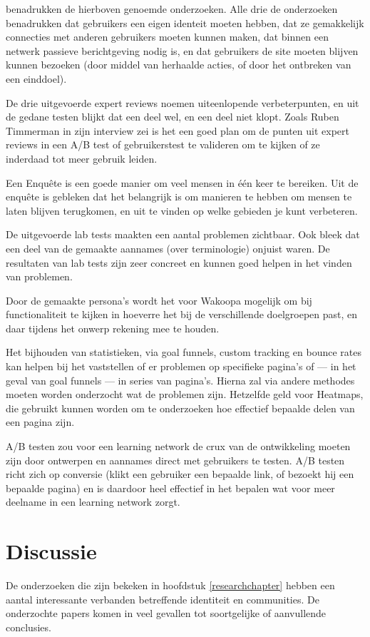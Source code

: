 \documentclass[a4paper, 10pt, pdftex]{report}
\begin{document}
    \citeauthor{Sloep2009} benadrukken de hierboven genoemde onderzoeken. Alle drie de onderzoeken benadrukken dat gebruikers een eigen identeit moeten hebben, dat ze gemakkelijk connecties met anderen gebruikers moeten kunnen maken, dat binnen een netwerk passieve berichtgeving nodig is, en dat gebruikers de site moeten blijven kunnen bezoeken (door middel van herhaalde acties, of door het ontbreken van een einddoel).

    De drie uitgevoerde expert reviews noemen uiteenlopende verbeterpunten, en uit de gedane testen blijkt dat een deel wel, en een deel niet klopt. Zoals Ruben Timmerman in zijn interview zei is het een goed plan om de punten uit expert reviews in een A/B test of gebruikerstest te valideren om te kijken of ze inderdaad tot meer gebruik leiden.

    Een Enqu\^ete is een goede manier om veel mensen in \'e\'en keer te bereiken. Uit de enqu\^ete is gebleken dat het belangrijk is om manieren te hebben om mensen te laten blijven terugkomen, en uit te vinden op welke gebieden je kunt verbeteren.

    De uitgevoerde lab tests maakten een aantal problemen zichtbaar. Ook bleek dat een deel van de gemaakte aannames (over terminologie) onjuist waren. De resultaten van lab tests zijn zeer concreet en kunnen goed helpen in het vinden van problemen.

    Door de gemaakte persona's wordt het voor Wakoopa mogelijk om bij functionaliteit te kijken in hoeverre het bij de verschillende doelgroepen past, en daar tijdens het onwerp rekening mee te houden.

    Het bijhouden van statistieken, via goal funnels, custom tracking en bounce rates kan helpen bij het vaststellen of er problemen op specifieke pagina's of --- in het geval van goal funnels --- in series van pagina's. Hierna zal via andere methodes moeten worden onderzocht wat de problemen zijn. Hetzelfde geld voor Heatmaps, die gebruikt kunnen worden om te onderzoeken hoe effectief bepaalde delen van een pagina zijn.

    A/B testen zou voor een learning network de crux van de ontwikkeling moeten zijn door ontwerpen en aannames direct met gebruikers te testen. A/B testen richt zich op conversie (klikt een gebruiker een bepaalde link, of bezoekt hij een bepaalde pagina) en is daardoor heel effectief in het bepalen wat voor meer deelname in een learning network zorgt.

  \newpage
  \chapter*{Discussie}
  De onderzoeken die zijn bekeken in hoofdstuk \ref{researchchapter} hebben een aantal interessante verbanden betreffende identiteit en communities. De onderzochte papers komen in veel gevallen tot soortgelijke of aanvullende conclusies.
\end{document}
